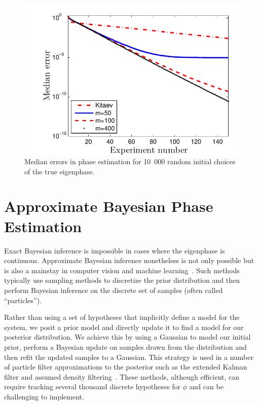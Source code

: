 \documentclass[aps,pra,amsmath,twocolumn,amssymb,superscriptaddress]{revtex4-1}
\begin{document}
\begin{figure}[t!]
    \begin{centering}
        \includegraphics[width=0.8\linewidth]{PEerror.pdf}
    \end{centering}
    \caption{\label{fig:PEerror}
     Median errors in phase estimation for 10~000 random initial choices of the true eigenphase.
    }
\end{figure}





\section{Approximate Bayesian Phase Estimation}
Exact Bayesian inference is impossible in cases where the eigenphase is continuous.  
Approximate Bayesian inference nonetheless is not only possible but is also a mainstay in computer vision and machine learning~\cite{haykin2004kalman,smith2013sequential}.
Such methods typically use sampling methods to discretize the prior distribution and then perform Bayesian inference on the discrete set of samples (often called ``particles'').

Rather than using a set of hypotheses that implicitly define a model for the system, we posit a prior model and directly update it to find a model for our posterior distribution.  We achieve this by using a Gaussian to model our initial prior, perform a Bayesian update on samples drawn from the distribution and then refit the updated samples to a Gaussian.  This strategy is used in a number of particle filter approximations to the posterior such as the extended Kalman filter and assumed density filtering~\cite{haykin2004kalman,opper1998bayesian}.
These methods, although efficient, can require tracking several thousand
discrete hypotheses for $\phi$ and can be challenging to implement.  
\end{document}
